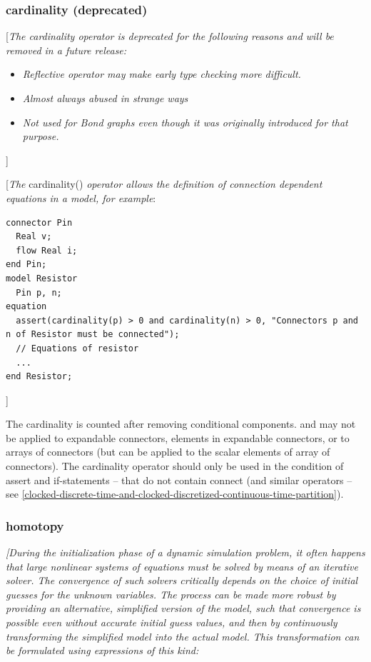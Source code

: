 \documentclass[10pt,a4paper]{report}
\def\doublelabel#1{\label{#1}}
\begin{document}
\subsubsection{cardinality (deprecated)}\doublelabel{cardinality-deprecated}

{[}\emph{The cardinality operator is deprecated for the following
reasons and will be removed in a future release:}

\begin{itemize}
\item
  \emph{Reflective operator may make early type checking more
  difficult.}
\item
  \emph{Almost always abused in strange ways}
\item
  \emph{Not used for Bond graphs even though it was originally
  introduced for that purpose.}
\end{itemize}

{]}

{[}\emph{The} cardinality() \emph{operator allows the definition of
connection dependent equations in a model, for example}:

\begin{lstlisting}[language=modelica]
connector Pin
  Real v;
  flow Real i;
end Pin;
model Resistor
  Pin p, n;
equation
  assert(cardinality(p) > 0 and cardinality(n) > 0, "Connectors p and n of Resistor must be connected");
  // Equations of resistor
  ...
end Resistor;
\end{lstlisting}

{]}

The cardinality is counted after removing conditional components. and
may not be applied to expandable connectors, elements in expandable
connectors, or to arrays of connectors (but can be applied to the scalar
elements of array of connectors). The cardinality operator should only
be used in the condition of assert and if-statements -- that do not
contain connect (and similar operators -- see \ref{clocked-discrete-time-and-clocked-discretized-continuous-time-partition}).

\subsubsection{homotopy}\doublelabel{homotopy}

\emph{{[}During the initialization phase of a dynamic simulation
problem, it often happens that large nonlinear systems of equations must
be solved by means of an iterative solver. The convergence of such
solvers critically depends on the choice of initial guesses for the
unknown variables. The process can be made more robust by providing an
alternative, simplified version of the model, such that convergence is
possible even without accurate initial guess values, and then by
continuously transforming the simplified model into the actual model.
This transformation can be formulated using expressions of this kind:}
\end{document}
